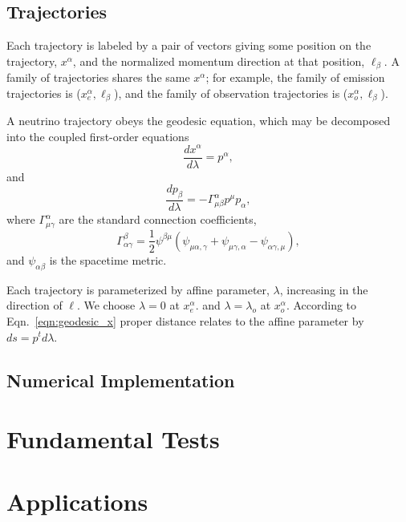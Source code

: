 \documentclass[aps,prd,twocolumn,superscriptaddress,groupedaddress]{revtex4}
\begin{document}
\subsection{Trajectories}
\label{ssc:trajectories}
Each trajectory is labeled by a pair of vectors
giving some position on the trajectory, $x^\alpha$,
and the normalized momentum direction at that position,
$\ell_\beta$.
A family of trajectories shares the same $x^\alpha$; for example,
the family of emission trajectories is ($x^\alpha_e,\ell_\beta$),
and the family of observation trajectories is ($x^\alpha_o,\ell_\beta$).

A neutrino trajectory obeys the geodesic equation, which may be decomposed into
the coupled first-order equations
\begin{equation}
\label{eqn:geodesic_x}
  \frac{d x^\alpha}{d\lambda} = p^\alpha,
\end{equation}
and
\begin{equation}
\label{eqn:geodesic_p}
  \frac{d p_\beta}{d\lambda} = -\Gamma^\alpha_{\mu\beta} p^\mu p_\alpha,
\end{equation}
where $\Gamma^\alpha_{\mu\gamma}$ are the standard connection coefficients,
\begin{equation}
  \label{eqn:christoffel}
  \Gamma^\beta_{\alpha\gamma} =
  \frac{1}{2} \psi^{\beta\mu}
  (\psi_{\mu\alpha,\gamma} + \psi_{\mu\gamma,\alpha} - \psi_{\alpha\gamma,\mu}),
\end{equation}
and $\psi_{\alpha\beta}$ is the spacetime metric.

Each trajectory is parameterized by affine parameter, $\lambda$, increasing in
the direction of $\ell$. We choose $\lambda=0$ at $x^\alpha_e$.
and $\lambda=\lambda_o$ at $x^\alpha_o$.
According to Eqn.~\ref{eqn:geodesic_x} proper distance relates to the affine
parameter by $ds=p^t d\lambda$.

\subsection{Numerical Implementation}
\label{sec:numerical}

\section{Fundamental Tests}
\label{sec:tests}

\section{Applications}
\label{sec:applications}
\end{document}

